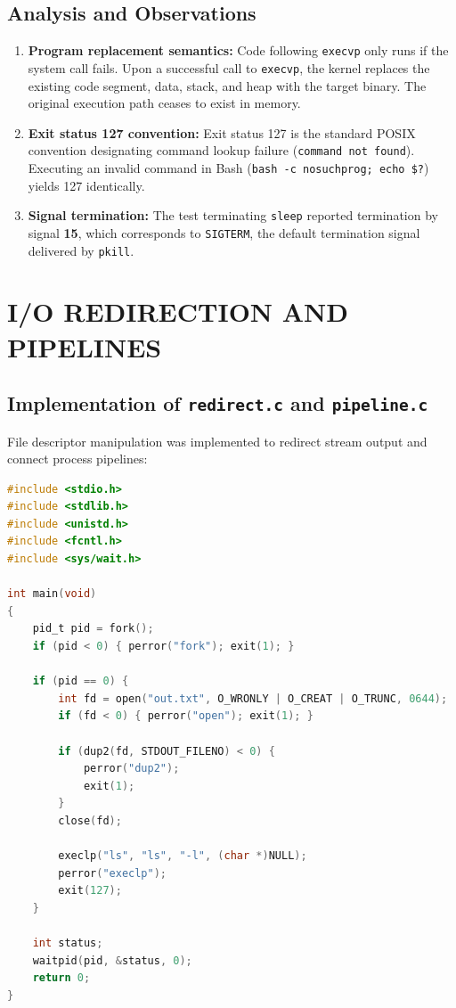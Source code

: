 \documentclass[12pt,a4paper]{report}
\numberwithin{equation}{chapter}
\numberwithin{figure}{chapter}
\numberwithin{table}{chapter}
\begin{document}
\section{Analysis and Observations}
\begin{enumerate}
    \item \textbf{Program replacement semantics:}
    Code following \texttt{execvp} only runs if the system call fails. Upon a successful call to \texttt{execvp}, the kernel replaces the existing code segment, data, stack, and heap with the target binary. The original execution path ceases to exist in memory.
    \item \textbf{Exit status 127 convention:}
    Exit status 127 is the standard POSIX convention designating command lookup failure (\texttt{command not found}). Executing an invalid command in Bash (\texttt{bash -c nosuchprog; echo \$?}) yields 127 identically.
    \item \textbf{Signal termination:}
    The test terminating \texttt{sleep} reported termination by signal \textbf{15}, which corresponds to \texttt{SIGTERM}, the default termination signal delivered by \texttt{pkill}.
\end{enumerate}

\chapter{I/O REDIRECTION AND PIPELINES}

\section{Implementation of \texttt{redirect.c} and \texttt{pipeline.c}}
File descriptor manipulation was implemented to redirect stream output and connect process pipelines:

\begin{lstlisting}[language=C, caption={Descriptor redirection in \texttt{redirect.c}}]
#include <stdio.h>
#include <stdlib.h>
#include <unistd.h>
#include <fcntl.h>
#include <sys/wait.h>

int main(void)
{
    pid_t pid = fork();
    if (pid < 0) { perror("fork"); exit(1); }

    if (pid == 0) {
        int fd = open("out.txt", O_WRONLY | O_CREAT | O_TRUNC, 0644);
        if (fd < 0) { perror("open"); exit(1); }

        if (dup2(fd, STDOUT_FILENO) < 0) {
            perror("dup2");
            exit(1);
        }
        close(fd);

        execlp("ls", "ls", "-l", (char *)NULL);
        perror("execlp");
        exit(127);
    }

    int status;
    waitpid(pid, &status, 0);
    return 0;
}
\end{lstlisting}
\end{document}
